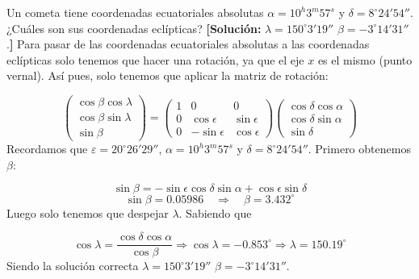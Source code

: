 \begin{texercise}
	Un cometa tiene coordenadas ecuatoriales absolutas $\alpha = 10^{h}3^{m}57^{s}$ y $\delta = 8^\circ24'54''$. ¿Cuáles son sus coordenadas eclípticas?  
	\textbf{[Solución:} $\lambda = 150^\circ3'19''$	$\beta = -3^\circ14'31''$.\textbf{]}
	\tcblower
	Para pasar de las coordenadas ecuatoriales absolutas a las coordenadas eclípticas solo tenemos que hacer una rotación, ya que el eje $x$ es el mismo (punto vernal). Así pues, solo tenemos que aplicar la matriz de rotación: 

	\begin{equation}
		\begin{pmatrix}
			\cos \beta \cos \lambda \\
			\cos \beta \sin \lambda \\
			\sin \beta
		\end{pmatrix} =\begin{pmatrix}
			1 & 0 & 0 \\
			0 & \cos \epsilon & \sin \epsilon \\
			0 & -\sin \epsilon &  \cos \epsilon
		\end{pmatrix}
		\begin{pmatrix}
			\cos \delta \cos \alpha \\
			\cos \delta \sin \alpha \\
			\sin \delta
		\end{pmatrix}
	\end{equation}
	Recordamos que $\varepsilon=20^\circ 26' 29''$, $\alpha = 10^{h}3^{m}57^{s}$ y $\delta = 8^\circ24'54''$. Primero obtenemos $\beta$:

	\begin{equation}
		\sin \beta = - \sin \epsilon \cos \delta \sin \alpha + \cos \epsilon \sin \delta 
	\end{equation}
	\begin{equation}
		\sin \beta = 0.05986\quad \Longrightarrow \quad \beta = 3.432^\circ
	\end{equation}
	Luego solo tenemos que despejar $\lambda$. Sabiendo que 

	\begin{equation}
		\cos \lambda = \frac{\cos \delta \cos \alpha}{\cos \beta} \Rightarrow \cos \lambda = -0.853^\circ \Rightarrow \lambda = 150.19^\circ
	\end{equation}
	Siendo la solución correcta $\lambda = 150^\circ3'19''$	$\beta = -3^\circ14'31''$.
\end{texercise}

\tcbstoprecording
